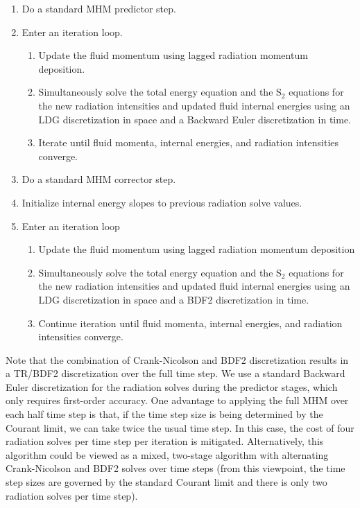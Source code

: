 \documentclass[preprint,12pt]{elsarticle}
\begin{document}
\begin{enumerate}
  \item Do a standard MHM predictor step. 
  \item Enter an iteration loop.
  \begin{enumerate}
    \item Update the fluid momentum using lagged radiation momentum deposition.
    \item Simultaneously solve the total energy equation and the S$_2$ equations for the new radiation 
        intensities and updated fluid internal energies using an LDG discretization 
    in space and a Backward Euler discretization in time.
    \item Iterate until fluid momenta, internal energies, and radiation intensities converge.
  \end{enumerate}
  \item Do a standard MHM corrector step.
  \item Initialize internal energy slopes to previous radiation solve values.
  \item Enter an iteration loop
  \begin{enumerate}
  \item Update the fluid momentum using lagged radiation momentum deposition
  \item Simultaneously solve the total energy equation and the S$_2$ equations for the new radiation intensities and updated fluid internal energies 
	using an LDG discretization in space and a BDF2 discretization in time.
  \item Continue iteration until fluid momenta, internal energies, and radiation intensities converge.
  \end{enumerate}
\end{enumerate}
Note that the combination of Crank-Nicolson and BDF2 discretization results in
a TR/BDF2 discretization over the full time step.  We use a standard Backward
Euler discretization for the radiation solves during the predictor stages,
which only requires first-order accuracy.  One advantage to applying the full
MHM over each half time step is that, if the time step size is being determined
by the Courant limit, we can take twice the usual time step.  In this case, the
cost of four radiation solves per time step per iteration is mitigated.
Alternatively, this algorithm could be viewed as a mixed, two-stage algorithm
with alternating Crank-Nicolson and BDF2 solves over time steps (from this
viewpoint, the time step sizes are governed by the standard Courant limit and
there is only two radiation solves per time step).  
\end{document}
